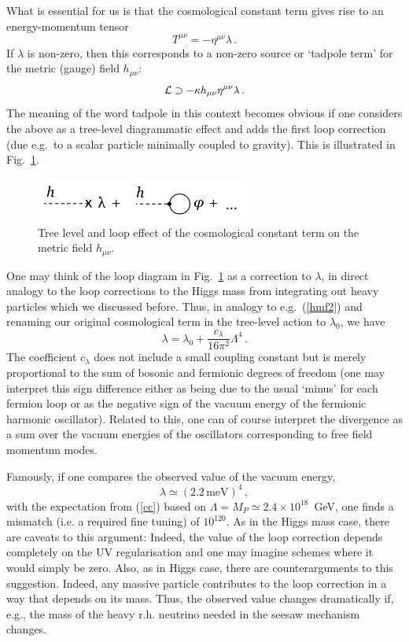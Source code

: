 \documentclass[12pt]{article}
\newcommand{\be}{\begin{equation}}
\newcommand{\ee}{\end{equation}}
\numberwithin{equation}{section}
\begin{document}
What is essential for us is that the cosmological constant term gives rise to an energy-momentum tensor
\be
T^{\mu\nu}=- \eta^{\mu\nu}\lambda\,.
\ee
If $\lambda$ is non-zero, then this corresponds to a non-zero source or `tadpole term' for the metric (gauge) field $h_{\mu\nu}$:
\be
{\cal L}\supset -\kappa h_{\mu\nu}\eta^{\mu\nu}\lambda\,.
\ee
The meaning of the word tadpole in this context becomes obvious if one considers the above as a tree-level diagrammatic effect and adds the first loop correction (due e.g.~to a scalar particle minimally coupled to gravity). This is illustrated in Fig.~\ref{tad}. 

\begin{figure}[ht]
\begin{center} 
\includegraphics[width=7cm]{tad.png}
\caption{Tree level and loop effect of the cosmological constant term on the metric field $h_{\mu\nu}$.}
\label{tad} 
\end{center}
\end{figure}

One may think of the loop diagram in Fig.~\ref{tad} as a correction to $\lambda$, in direct analogy to the loop corrections to the Higgs mass from integrating out heavy particles which we discussed before. Thus, in analogy to e.g.~(\ref{hmf2}) and renaming our original cosmological term in the tree-level action to $\lambda_0$, we have
\be
\lambda=\lambda_0+\frac{c_\lambda}{16\pi^2}\Lambda^4\,.\label{cc}
\ee
The coefficient $c_\lambda$ does not include a small coupling constant but is merely proportional to the sum of bosonic and fermionic degrees of freedom (one may interpret this sign difference either as being due to the usual `minus' for each fermion loop or as the negative sign of the vacuum energy of the fermionic harmonic oscillator). Related to this, one can of course interpret the divergence as a sum over the vacuum energies of the oscillators corresponding to free field momentum modes. 

Famously, if one compares the observed value of the vacuum energy,
\be
\lambda\simeq (2.2\,\mbox{meV})^4\,,
\ee
with the expectation from (\ref{cc}) based on $\Lambda=M_P\simeq 2.4\times 10^{18}$~GeV, one finds a mismatch (i.e. a required fine tuning) of $10^{120}$. As in the Higgs mass case, there are caveats to this argument: Indeed, the value of the loop correction depends completely on the UV regularisation and one may imagine schemes where it would simply be zero. Also, as in Higgs case, there are counterarguments to this suggestion. Indeed, any massive particle contributes to the loop correction in a way that depends on its mass. Thus, the observed value changes dramatically if, e.g., the mass of the heavy r.h. neutrino needed in the seesaw mechanism changes.
\end{document}
